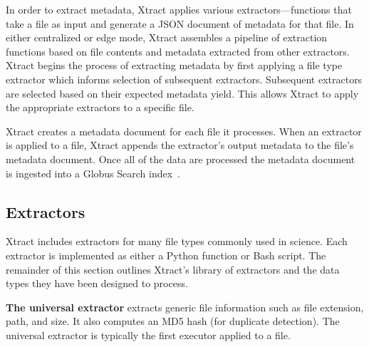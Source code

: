 \documentclass[sigconf]{acmart}
\newcommand{\kyle}[1]{}
\newcommand{\ryan}[1]{}
\newcommand{\kyle}[1]{{\textcolor{purple}{ Kyle: #1 }}}
\newcommand{\ryan}[1]{{\textcolor{magenta}{ Ryan: #1 }}}
\newcommand{\name}{Xtract}
\begin{document}
In order to extract metadata, \name{} applies various extractors---functions that take a file as input 
and generate a JSON document of metadata for that file. 
In either centralized or edge mode, \name{} assembles a pipeline of extraction functions based on
file contents and metadata extracted from other extractors. 
\name{} begins the process of extracting metadata by first applying 
a file type extractor which informs selection of subsequent extractors. 
Subsequent extractors are selected based on their expected metadata yield. 
This allows \name{} to apply the appropriate extractors to a specific file. 

\name{} creates a metadata document for each file it processes. When an extractor is applied
to a file, \name{} appends the extractor's output metadata to the file's metadata document.
Once all of the data are processed the metadata document is ingested into a Globus 
Search index~\cite{ananthakrishnan2018globus}. 


\subsection{Extractors}

\name{} includes extractors for many file types commonly used in science. 
Each extractor is implemented as either a Python function or Bash script. 
The remainder of this section outlines \name{}'s library of extractors and
the data types they have been designed to process. 

\textbf{The universal extractor}
extracts generic file information such as file extension,
path, and size. It also computes an MD5 hash (for duplicate detection). 
The universal extractor is typically the first executor applied to a 
file. 

\end{document}
